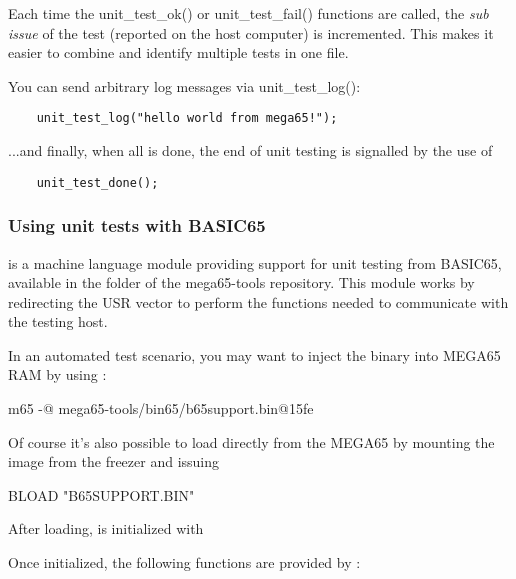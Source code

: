 Each time the unit\_test\_ok() or unit\_test\_fail() 
functions are called, the \textit{sub issue} of the test (reported on 
the host computer) is incremented. This makes it easier to combine and 
identify multiple tests in one file.

You can send arbitrary log messages via unit\_test\_log():

\begin{verbatim}
    unit_test_log("hello world from mega65!");
\end{verbatim}

...and finally, when all is done, the end of unit testing is signalled
by the use of

\begin{verbatim}
    unit_test_done();
\end{verbatim}


\subsubsection{Using unit tests with BASIC65}

 is a machine language module providing support for 
unit testing from BASIC65, available in the  folder of the mega65-tools 
repository. This module works by redirecting the USR vector to perform the functions 
needed to communicate with the testing host.

In an automated test scenario, you may want to inject the  
binary into MEGA65 RAM by using :

    \begin{screenoutput}
        m65 -@ mega65-tools/bin65/b65support.bin@15fe
    \end{screenoutput}


Of course it's also possible to load  directly from the
MEGA65 by mounting the  image from the freezer and issuing

\begin{screenoutput}
    BLOAD "B65SUPPORT.BIN"
\end{screenoutput}

After loading,  is initialized with


Once initialized, the following functions are provided by :

